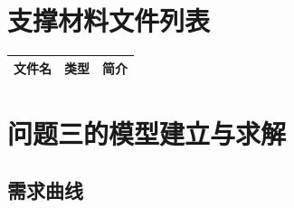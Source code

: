 \begin{appendices}

\section{支撑材料文件列表}

\begin{table}[H]
    \centering
    \label{支撑材料}
    \begin{tabular}{ccc}
        \toprule[1.5pt]
        \textbf{文件名} & \textbf{类型} & \textbf{简介} \\
        \midrule[1.0pt]
        
        \bottomrule[1.5pt]
    \end{tabular}
\end{table}



\section{问题三的模型建立与求解}

\subsection{需求曲线}

\begin{lstlisting}[language=python]
    
\end{lstlisting}

\end{appendices}